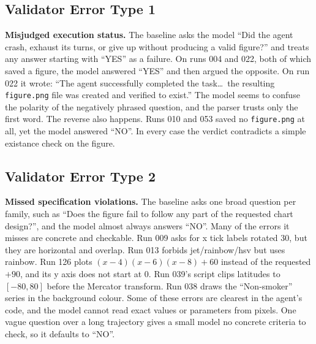 \documentclass[11pt]{article}
\begin{document}
\subsection{Validator Error Type 1}
\textbf{Misjudged execution status.} The baseline asks the model ``Did the agent
crash, exhaust its turns, or give up without producing a valid figure?'' and
treats any answer starting with ``YES'' as a failure. On runs 004 and 022, both
of which saved a figure, the model answered ``YES'' and then argued the
opposite. On run 022 it wrote: ``The agent successfully completed the
task\ldots\ the resulting \texttt{figure.png} file was created and verified to
exist.'' The model seems to confuse the polarity of the negatively phrased
question, and the parser trusts only the first word. The reverse also happens.
Runs 010 and 053 saved no \texttt{figure.png} at all, yet the model answered
``NO''. In every case the verdict contradicts a simple existance check on the figure.

\subsection{Validator Error Type 2}
\textbf{Missed specification violations.} The baseline asks one broad question
per family, such as ``Does the figure fail to follow any part of the requested
chart design?'', and the model almost always answers ``NO''. Many of the errors
it misses are concrete and checkable. Run 009 asks for x tick labels rotated
30\textdegree, but they are horizontal and overlap. Run 013 forbids
jet/rainbow/hsv but uses rainbow. Run 126 plots $(x-4)(x-6)(x-8)+60$ instead of
the requested $+90$, and its y axis does not start at 0. Run 039's script clips
latitudes to $[-80, 80]$ before the Mercator transform. Run 038 draws the
``Non-smoker'' series in the background colour. Some of these errors are clearest
in the agent's code, and the model cannot read exact values or parameters from
pixels. One vague question over a long trajectory gives a small model no
concrete criteria to check, so it defaults to ``NO''.
\end{document}
